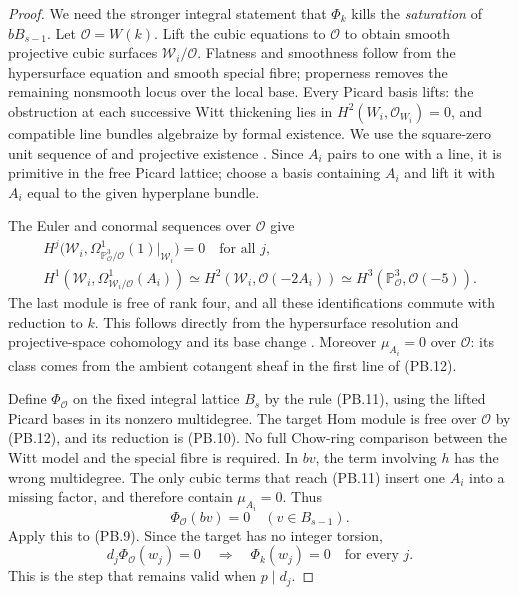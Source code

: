 \begin{proof}
We need the stronger integral statement that $\Phi_k$ kills the
\emph{saturation} of $bB_{s-1}$. Let $\mathcal O=W(k)$. Lift the
cubic equations to $\mathcal O$ to obtain smooth projective cubic
surfaces $\mathcal W_i/\mathcal O$. Flatness and smoothness follow
from the hypersurface equation and smooth special fibre; properness
removes the remaining nonsmooth locus over the local base.
Every Picard basis lifts: the obstruction at each successive Witt
thickening lies in $H^2(W_i,\mathcal O_{W_i})=0$, and compatible
line bundles algebraize by formal existence. We use the square-zero
unit sequence of \citet[Lemma 37.4.1, Tag 0C6R]{frC3azStacksPicThickening}
and projective existence
\citep[Lemma 30.24.3, Tag 0885]{frC3azStacksExistence}.
Since $A_i$ pairs to one with a line, it is primitive in the free
Picard lattice; choose a basis containing $A_i$ and lift it with
$A_i$ equal to the given hyperplane bundle.

The Euler and conormal sequences over $\mathcal O$ give
\[
 \begin{gathered}
 H^j\bigl(\mathcal W_i,
        \Omega^1_{\mathbb P^3_{\mathcal O}/\mathcal O}(1)|_{\mathcal W_i}
       \bigr)=0\quad\text{for all }j,\\
 H^1(\mathcal W_i,\Omega^1_{\mathcal W_i/\mathcal O}(A_i))
   \simeq H^2(\mathcal W_i,\mathcal O(-2A_i))
   \simeq H^3(\mathbb P^3_{\mathcal O},\mathcal O(-5)).
 \end{gathered}
 \tag{PB.12}
\]
The last module is free of rank four, and all these identifications
commute with reduction to $k$. This follows directly from the
hypersurface resolution and projective-space cohomology and its base
change \citep[Lemmas 30.8.1--30.8.2, Tag 01XS]{frPrimitiveProjectiveCohomology}.
Moreover $\mu_{A_i}=0$ over $\mathcal O$: its class comes from the
ambient cotangent sheaf in the first line of (PB.12).

Define $\Phi_{\mathcal O}$ on the fixed integral lattice $B_s$ by
the rule (PB.11), using the lifted Picard bases in its nonzero
multidegree. The target Hom module is free over $\mathcal O$ by
(PB.12), and its reduction is (PB.10). No full Chow-ring comparison
between the Witt model and the special fibre is required. In $bv$,
the term involving $h$ has the wrong multidegree. The only cubic
terms that reach (PB.11) insert one $A_i$ into a missing factor,
and therefore contain $\mu_{A_i}=0$. Thus
\[
 \Phi_{\mathcal O}(bv)=0\quad(v\in B_{s-1}).
\]
Apply this to (PB.9). Since the target has no integer torsion,
\[
 d_j\Phi_{\mathcal O}(w_j)=0
        \quad\Longrightarrow\quad \Phi_k(w_j)=0
                                  \quad\text{for every }j.
 \tag{PB.13}
\]
This is the step that remains valid when $p\mid d_j$.


\end{proof}
